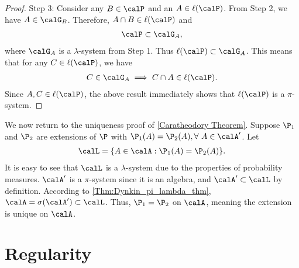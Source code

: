 \documentclass[../aipt.tex]{subfiles}
\begin{document}
\begin{proof}
Step 3: Consider any $B \in \calP$ and an $A \in \ell(\calP)$. From Step 2, we have $A \in \calG_B$. Therefore, $A \cap B \in \ell(\calP)$ and 
\begin{align*}
\calP \subset \calG_A,
\end{align*}
where $\calG_A$ is a $\lambda$-system from Step 1. Thus $\ell(\calP) \subset \calG_A$. This means that for any $C \in \ell(\calP)$, we have
\begin{align*}
C \in \calG_A \implies C \cap A \in \ell(\calP).
\end{align*}
Since $A, C \in \ell(\calP)$, the above result immediately shows that $\ell(\calP)$ is a $\pi$-system.
\end{proof}

We now return to the uniqueness proof of \cref{Caratheodory Theorem}. Suppose $\P_1$ and $\P_2$ are extensions of $\P$ with $\P_1(A) = \P_2(A), \forall\ A \in \calA'$. Let
\begin{align*}
\calL = \{A \in \calA: \P_1(A) = \P_2(A) \}.
\end{align*}
It is easy to see that $\calL$ is a $\lambda$-system due to the properties of probability measures. $\calA'$ is a $\pi$-system since it is an algebra, and $\calA' \subset \calL$ by definition. According to \cref{Thm:Dynkin_pi_lambda_thm}, $\calA = \sigma(\calA') \subset \calL$. Thus, $\P_1 = \P_2$ on $\calA$, meaning the extension is unique on $\calA$.

\section{Regularity}
\end{document}
